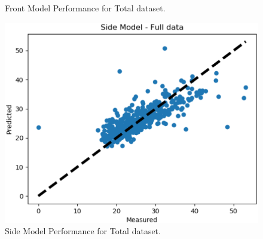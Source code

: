 \documentclass[conference]{IEEEtran}
\begin{document}
\begin{figure}[H]
\begin{minipage}[b]{0.25\textwidth}
    \caption{Front Model Performance for Total dataset.}
    \label{fig:frontscatter}
    \end{minipage}
    \hspace{1cm}
    \begin{minipage}[b]{0.25\textwidth}
    \includegraphics[width=\linewidth]{sidescatter.png}
    \caption{Side Model Performance for Total dataset.}
    \label{fig:sidescatter}
    \end{minipage}
\end{figure}
\end{document}
